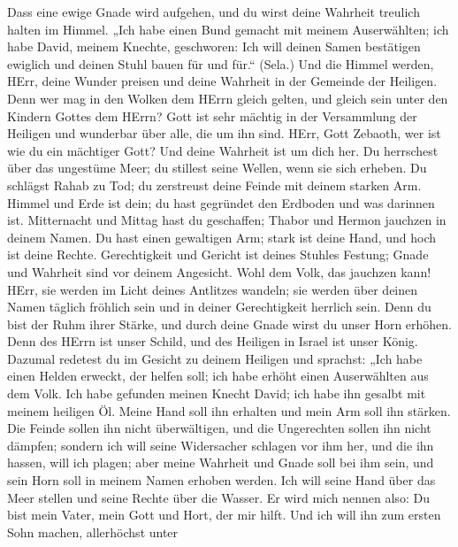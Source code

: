 Dass eine ewige Gnade wird aufgehen, und du wirst deine Wahrheit
treulich halten im Himmel.  „Ich habe einen Bund gemacht mit
meinem Auserwählten; ich habe David, meinem Knechte, geschworen:
 Ich will deinen Samen bestätigen ewiglich und deinen Stuhl
bauen für und für.`` (Sela.)  Und die Himmel werden, HErr,
deine Wunder preisen und deine Wahrheit in der Gemeinde der Heiligen.
 Denn wer mag in den Wolken dem HErrn gleich gelten, und
gleich sein unter den Kindern Gottes dem HErrn?  Gott ist
sehr mächtig in der Versammlung der Heiligen und wunderbar über alle,
die um ihn sind.  HErr, Gott Zebaoth, wer ist wie du ein
mächtiger Gott? Und deine Wahrheit ist um dich her.  Du
herrschest über das ungestüme Meer; du stillest seine Wellen, wenn sie
sich erheben.  Du schlägst Rahab zu Tod; du zerstreust
deine Feinde mit deinem starken Arm.  Himmel und Erde ist
dein; du hast gegründet den Erdboden und was darinnen ist. 
Mitternacht und Mittag hast du geschaffen; Thabor und Hermon jauchzen in
deinem Namen.  Du hast einen gewaltigen Arm; stark ist
deine Hand, und hoch ist deine Rechte.  Gerechtigkeit und
Gericht ist deines Stuhles Festung; Gnade und Wahrheit sind vor deinem
Angesicht.  Wohl dem Volk, das jauchzen kann! HErr, sie
werden im Licht deines Antlitzes wandeln;  sie werden über
deinen Namen täglich fröhlich sein und in deiner Gerechtigkeit herrlich
sein.  Denn du bist der Ruhm ihrer Stärke, und durch deine
Gnade wirst du unser Horn erhöhen.  Denn des HErrn ist
unser Schild, und des Heiligen in Israel ist unser König. 
Dazumal redetest du im Gesicht zu deinem Heiligen und sprachst: „Ich
habe einen Helden erweckt, der helfen soll; ich habe erhöht einen
Auserwählten aus dem Volk.  Ich habe gefunden meinen Knecht
David; ich habe ihn gesalbt mit meinem heiligen Öl.  Meine
Hand soll ihn erhalten und mein Arm soll ihn stärken.  Die
Feinde sollen ihn nicht überwältigen, und die Ungerechten sollen ihn
nicht dämpfen;  sondern ich will seine Widersacher schlagen
vor ihm her, und die ihn hassen, will ich plagen;  aber
meine Wahrheit und Gnade soll bei ihm sein, und sein Horn soll in meinem
Namen erhoben werden.  Ich will seine Hand über das Meer
stellen und seine Rechte über die Wasser.  Er wird mich
nennen also: Du bist mein Vater, mein Gott und Hort, der mir hilft.
 Und ich will ihn zum ersten Sohn machen, allerhöchst unter
